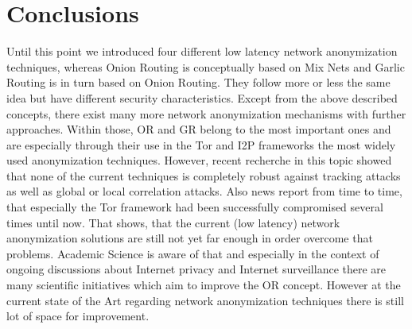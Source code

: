 \documentclass{sig-alternate}
\begin{document}
\section{Conclusions}
Until this point we introduced four different low latency network anonymization techniques, whereas Onion Routing is conceptually based on Mix Nets and Garlic Routing is in turn based on Onion Routing. They follow more or less the same idea but have different security characteristics. Except from the above described concepts, there exist many more network anonymization mechanisms with further approaches. Within those, OR and GR belong to the most important ones and are especially through their use in the Tor and I2P frameworks the most widely used anonymization techniques. However, recent recherche in this topic showed that none of the current techniques is completely robust against tracking attacks as well as global or local correlation attacks. Also news report\cite{torhacked} from time to time, that especially the Tor framework had been successfully compromised several times until now. That shows, that the current (low latency) network anonymization solutions are still not yet far enough in order overcome that problems. Academic Science is aware of that and especially in the context of ongoing discussions about Internet privacy and Internet surveillance there are many scientific initiatives\cite{ORpublications} which aim to improve the OR concept. However at the current state of the Art regarding network anonymization techniques there is still lot of space for improvement. 



\end{document}
